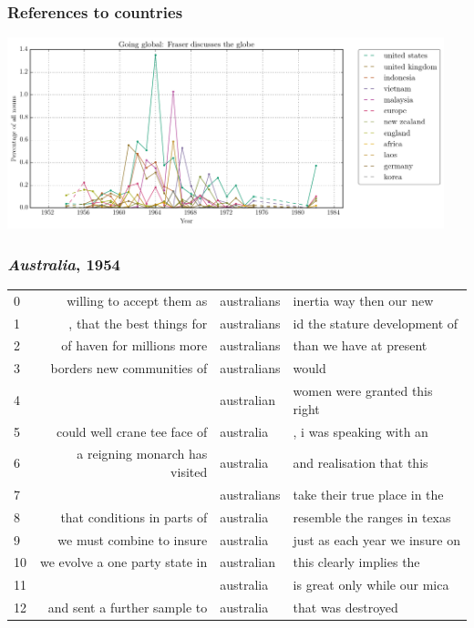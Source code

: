 \documentclass{beamer}       %
\begin{document}
\begin{frame}
\frametitle{References to countries}
    \centering
    \includegraphics[width=0.95\textwidth]{images/going-global-fraser-discusses-the-globe.png}
\end{frame}


\begin{frame}
	\frametitle{\emph{Australia}, 1954}
\begin{table}
\tiny
\begin{tabular}{lrll}
   0 &        willing to accept them as & australians  & inertia way then our new \\
   1 &       , that the best things for & australians  & id the stature development of \\
   2 &       of haven for millions more & australians  & than we have at present \\
   3 &       borders new communities of & australians  & would \\
   4 &                                  & australian   & women were granted this right \\
   5 &     could well crane tee face of & australia    & , i was speaking with an \\
   6 &   a reigning monarch has visited & australia    & and realisation that this \\
   7 &                                  & australians  & take their true place in the \\
   8 &      that conditions in parts of & australia    & resemble the ranges in texas \\
   9 &        we must combine to insure & australia    & just as each year we insure on \\
  10 &   we evolve a one party state in & australian   & this clearly implies the \\
  11 &                                  & australia    & is great only while our mica \\
  12 &     and sent a further sample to & australia    & that was destroyed \\

\end{tabular}
\end{table}
\end{frame}
\end{document}
